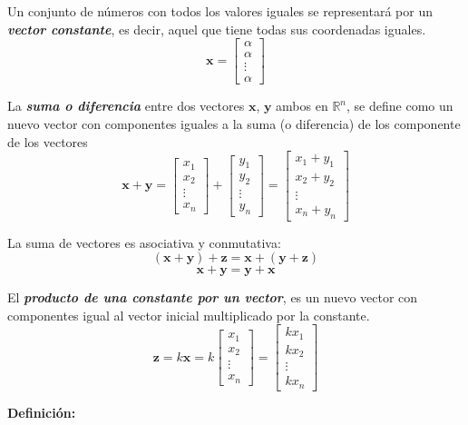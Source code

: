 \documentclass[12pt,letterpaper]{report} %
\begin{document}
Un conjunto de números con todos los valores iguales se representará por un \textit{\textbf{vector constante}}, es decir, aquel que tiene todas sus coordenadas iguales.
$$
\mathbf{x}=\begin{bmatrix} \alpha \\ \alpha \\ \vdots \\ \alpha\end{bmatrix}
$$

La \textit{\textbf{suma o diferencia}} entre dos vectores $\mathbf{x}$, $\mathbf{y}$ ambos en $\mathbb{R}^n$, se define como un nuevo vector con componentes iguales a la suma (o diferencia) de los componente de los vectores
$$\mathbf{x}+\mathbf{y}=\begin{bmatrix} x_1 \\ x_2 \\ \vdots \\ x_n\end{bmatrix} + \begin{bmatrix} y_1 \\ y_2 \\ \vdots \\ y_n\end{bmatrix}=\begin{bmatrix} x_1+y_1\\ x_2+y_2 \\ \vdots \\ x_n+y_n\end{bmatrix}$$

La suma de vectores es asociativa y conmutativa:\\
$$(\mathbf{x}+\mathbf{y})+\mathbf{z}=\mathbf{x}+(\mathbf{y}+\mathbf{z})$$ 
$$\mathbf{x}+\mathbf{y}=\mathbf{y}+\mathbf{x}$$

El \textit{\textbf{producto de una constante por un vector}}, es un nuevo vector con componentes igual al vector inicial multiplicado por la constante.
$$\mathbf{z}=k\mathbf{x}=k \begin{bmatrix} x_1\\ x_2 \\ \vdots \\ x_n\end{bmatrix} =\begin{bmatrix} kx_1\\ kx_2 \\ \vdots \\ kx_n\end{bmatrix}$$

\textbf{Definición:} \\
\end{document}
